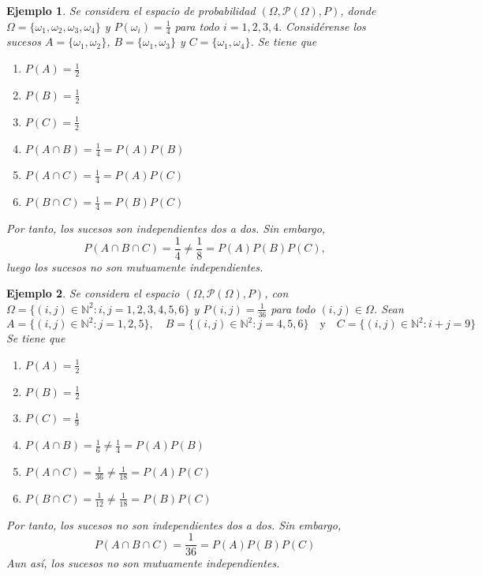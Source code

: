 \documentclass[11pt]{report}
\theoremstyle{mytheorem}
\theoremstyle{mydefinition}
\theoremstyle{myexample}
\newtheorem*{example}{Ejemplo}
\newcommand{\N}{\mathbb N}
\begin{document}
\begin{example}
Se considera el espacio de probabilidad $(\Omega, \mathcal{P}(\Omega),P)$, donde $\Omega = \{\omega_1,\omega_2,\omega_3,\omega_4\}$ y $P(\omega_i) = \frac{1}{4}$ para todo $i=1,2,3,4.$ Considérense los sucesos $A= \{\omega_1,\omega_2\}$, $B=\{\omega_1,\omega_3\}$ y $C=\{\omega_1,\omega_4\}$. Se tiene que

\begin{multicols}{2}
\begin{enumerate}
    \item $P(A) = \displaystyle{\frac{1}{2}}$
    \item $P(B) = \displaystyle{\frac{1}{2}}$
    \item $P(C) = \displaystyle{\frac{1}{2}}$
    \item $P(A \cap B) = \displaystyle{\frac{1}{4}} =P(A)P(B)$
    \item $P(A \cap C) = \displaystyle{\frac{1}{4}} =P(A)P(C)$
    \item $P(B \cap C) = \displaystyle{\frac{1}{4}} =P(B)P(C)$
\end{enumerate}
\end{multicols}

\vspace{-0.5\baselineskip}

Por tanto, los sucesos son independientes dos a dos. Sin embargo,
\[P(A\cap B \cap C) = \frac{1}{4} \neq \frac{1}{8} =P(A)P(B)P(C),\]
luego los sucesos no son mutuamente independientes.
\end{example}

\begin{example}
Se considera el espacio $(\Omega, \mathcal{P}(\Omega),P)$, con $\Omega = \{(i,j) \in \N^2 \colon i,j=1,2,3,4,5,6\}$ y $P(i,j) = \frac{1}{36}$ para todo $(i,j) \in \Omega$. Sean \[A = \{(i,j) \in \N^2 \colon j=1,2,5\}, \quad B =\{(i,j) \in \N^2 \colon j=4,5,6\} \quad \text{y} \quad C =\{(i,j) \in \N^2 \colon i+j=9\}\]
Se tiene que
\begin{multicols}{2}
\begin{enumerate}
    \item $P(A) = \displaystyle{\frac{1}{2}}$
    \item $P(B) = \displaystyle{\frac{1}{2}}$
    \item $P(C) = \displaystyle{\frac{1}{9}}$
    \item $P(A \cap B) = \displaystyle{\frac{1}{6}} \neq \displaystyle{\frac{1}{4}}=P(A)P(B)$
    \item $P(A \cap C) = \displaystyle{\frac{1}{36}}\neq \displaystyle{\frac{1}{18}} =P(A)P(C)$
    \item $P(B \cap C) = \displaystyle{\frac{1}{12}}\neq \displaystyle{\frac{1}{18}} =P(B)P(C)$
\end{enumerate}
\end{multicols}

\vspace{-0.5\baselineskip}

Por tanto, los sucesos no son independientes dos a dos. Sin embargo,
\[P(A\cap B \cap C) = \frac{1}{36} =P(A)P(B)P(C)\]
Aun así, los sucesos no son mutuamente independientes.
\end{example}
\end{document}
